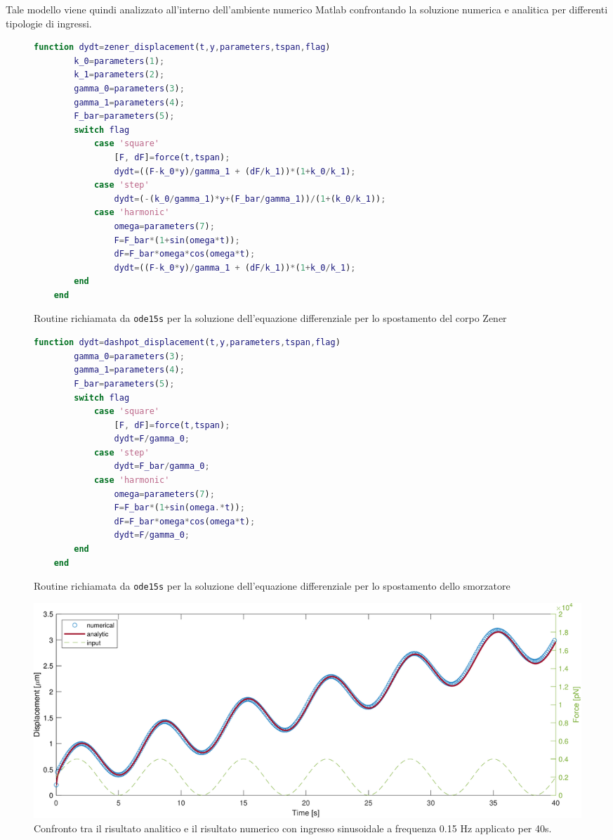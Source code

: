 Tale modello viene quindi analizzato all'interno dell'ambiente numerico Matlab confrontando la soluzione numerica e analitica per differenti tipologie di ingressi.

\begin{figure}[t!]
\begin{lstlisting}[language=matlab]
	function dydt=zener_displacement(t,y,parameters,tspan,flag)
		k_0=parameters(1);
		k_1=parameters(2);
		gamma_0=parameters(3);
		gamma_1=parameters(4);
		F_bar=parameters(5);
		switch flag
			case 'square'
				[F, dF]=force(t,tspan);
				dydt=((F-k_0*y)/gamma_1 + (dF/k_1))*(1+k_0/k_1);
			case 'step'
				dydt=(-(k_0/gamma_1)*y+(F_bar/gamma_1))/(1+(k_0/k_1));
			case 'harmonic'
				omega=parameters(7);
				F=F_bar*(1+sin(omega*t));
				dF=F_bar*omega*cos(omega*t);
				dydt=((F-k_0*y)/gamma_1 + (dF/k_1))*(1+k_0/k_1);
		end
	end
\end{lstlisting}
\caption{Routine richiamata da \texttt{ode15s} per la soluzione dell'equazione differenziale per lo spostamento del corpo Zener}
\vspace{0.8cm}
\begin{lstlisting}[language=matlab]
	function dydt=dashpot_displacement(t,y,parameters,tspan,flag)
		gamma_0=parameters(3);
		gamma_1=parameters(4);
		F_bar=parameters(5);
		switch flag
			case 'square'
				[F, dF]=force(t,tspan);
				dydt=F/gamma_0;
			case 'step'
				dydt=F_bar/gamma_0;
			case 'harmonic'
				omega=parameters(7);
				F=F_bar*(1+sin(omega.*t));
				dF=F_bar*omega*cos(omega*t);
				dydt=F/gamma_0;
		end
	end	
\end{lstlisting}
\caption{Routine richiamata da \texttt{ode15s} per la soluzione dell'equazione differenziale per lo spostamento dello smorzatore}
\label{fig:routineode}
\end{figure}

\begin{figure}[t!]
	\centering
	\includegraphics[width=0.95\linewidth]{../code/figs/harmoniclarge}
	\caption{Confronto tra il risultato analitico e il risultato numerico con ingresso sinusoidale a frequenza 0.15 Hz applicato per 40s.}
	\label{fig:harmoniclarge}
\end{figure}

